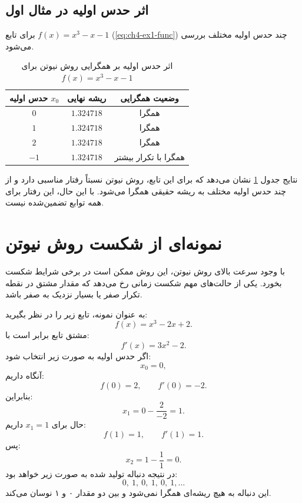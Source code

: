 \subsection{اثر حدس اولیه در مثال اول}

برای تابع $f(x)=x^3-x-1$ (\eqref{eq:ch4-ex1-func}) چند حدس اولیه مختلف بررسی می‌شود.

\begin{table}[H]
\centering
\caption{اثر حدس اولیه بر همگرایی روش نیوتن برای $f(x)=x^3-x-1$}
\label{tab:initial-guess}
\renewcommand{\arraystretch}{1.4}
\begin{tabular}{c c c}
\toprule[1.3pt]
حدس اولیه $x_0$ & ریشه نهایی & وضعیت همگرایی \\
\midrule[1pt]
$0$ & $1.324718$ & همگرا \\
$1$ & $1.324718$ & همگرا \\
$2$ & $1.324718$ & همگرا \\
$-1$ & $1.324718$ & همگرا با تکرار بیشتر \\
\bottomrule[1.3pt]
\end{tabular}
\end{table}

نتایج جدول \ref{tab:initial-guess} نشان می‌دهد که برای این تابع، روش نیوتن نسبتاً رفتار مناسبی دارد و از چند حدس اولیه مختلف به ریشه حقیقی همگرا می‌شود. با این حال، این رفتار برای همه توابع تضمین‌شده نیست.

\section{نمونه‌ای از شکست روش نیوتن}

با وجود سرعت بالای روش نیوتن، این روش ممکن است در برخی شرایط شکست بخورد. یکی از حالت‌های مهم شکست زمانی رخ می‌دهد که مقدار مشتق در نقطه تکرار صفر یا بسیار نزدیک به صفر باشد.

به عنوان نمونه، تابع زیر را در نظر بگیرید:
\begin{equation}
f(x)=x^3-2x+2.
\label{eq:ch4-fail-func}
\end{equation}
مشتق تابع برابر است با:
\begin{equation}
f'(x)=3x^2-2.
\label{eq:ch4-fail-deriv}
\end{equation}
اگر حدس اولیه به صورت زیر انتخاب شود:
\[
x_0=0,
\]
آنگاه داریم:
\[
f(0)=2,\qquad f'(0)=-2.
\]
بنابراین:
\[
x_1 = 0-\frac{2}{-2} = 1.
\]
حال برای $x_1=1$ داریم:
\[
f(1)=1,\qquad f'(1)=1.
\]
پس:
\[
x_2 = 1-\frac{1}{1} = 0.
\]
در نتیجه دنباله تولید شده به صورت زیر خواهد بود:
\[
0,\ 1,\ 0,\ 1,\ 0,\ 1,\ldots
\]
این دنباله به هیچ ریشه‌ای همگرا نمی‌شود و بین دو مقدار ۰ و ۱ نوسان می‌کند.

